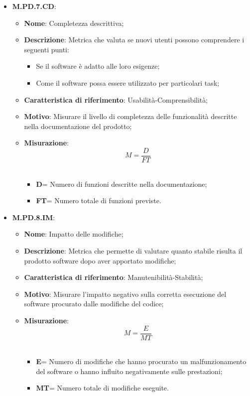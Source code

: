 \documentclass[10pt, a4paper]{article}
\begin{document}
\begin{itemize}
    \item \textbf{M.PD.7.CD}:
    \begin{itemize}
        \item \textbf{Nome}: Completezza descrittiva;
        \item \textbf{Descrizione}: Metrica che valuta se nuovi utenti possono comprendere i seguenti punti:
        \begin{itemize}
            \item Se il software è adatto alle loro esigenze; 
            \item Come il software possa essere utilizzato per particolari task;
        \end{itemize} 
        \item \textbf{Caratteristica di riferimento}: Usabilità-Comprensibilità;
        \item \textbf{Motivo}: Misurare il livello di completezza delle funzionalità descritte nella documentazione del prodotto; 
       \item \textbf{Misurazione}:   \[ M=\frac{D}{FT} \] \\
       \begin{itemize}
           \item \textbf{D}= Numero di funzioni descritte nella documentazione;
           \item \textbf{FT}= Numero totale di funzioni previste.\\
       \end{itemize}
    \end{itemize}



    \item \textbf{M.PD.8.IM}:
    \begin{itemize}
        \item \textbf{Nome}: Impatto delle modifiche;
        \item \textbf{Descrizione}: Metrica che permette di valutare quanto stabile risulta il prodotto software dopo aver apportato modifiche;
        \item \textbf{Caratteristica di riferimento}: Manutenibilità-Stabilità;
        \item \textbf{Motivo}: Misurare l'impatto negativo sulla corretta esecuzione del software procurato dalle modifiche del codice; 
       \item \textbf{Misurazione}:   \[ M=\frac{E}{MT} \] \\
       \begin{itemize}
           \item \textbf{E}= Numero di modifiche che hanno procurato un malfunzionamento del software o hanno influito negativamente sulle prestazioni;
           \item \textbf{MT}= Numero totale di modifiche eseguite.\\
       \end{itemize}
    \end{itemize}

\end{itemize}
\end{document}
